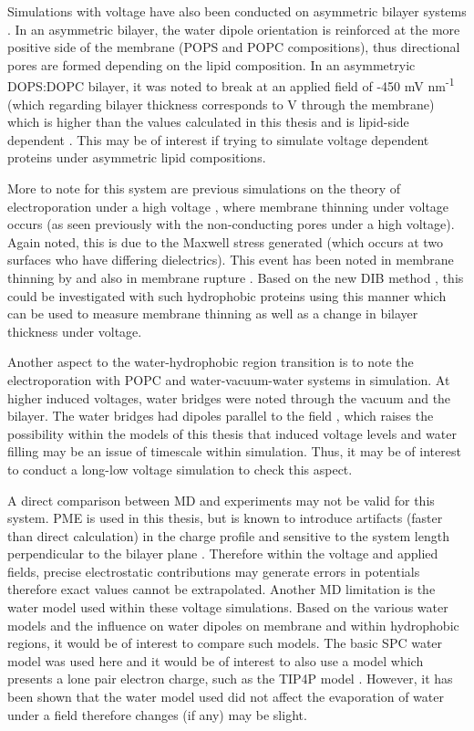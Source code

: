 Simulations with voltage have also been conducted on asymmetric bilayer systems \cite{Marrink1993,Saiz2002}. In an asymmetric bilayer, the water dipole orientation is reinforced at the more positive side of the membrane (POPS and POPC compositions), thus directional pores are formed depending on the lipid composition. In an asymmetryic DOPS:DOPC bilayer, it was noted to break at an applied field of -450 mV nm\textsuperscript{-1} (which regarding bilayer thickness corresponds to  V through the membrane) \cite{Vernier2006b} which is higher than the values calculated in this thesis and is lipid-side dependent \cite{Gurtovenko2014a}. This may be of interest if trying to simulate voltage dependent proteins under asymmetric lipid compositions.

More to note for this system are previous simulations on the theory of electroporation under a high voltage \cite{Hu2013c}, where membrane thinning under voltage occurs (as seen previously with the non-conducting pores under a high voltage). Again noted, this is due to the Maxwell stress generated (which occurs at two surfaces who have differing dielectrics). This event has been noted in membrane thinning by \cite{Needham1989,Kummrow1991} and also in membrane rupture \cite{Isambert1998,Gao2008}. Based on the new DIB method \cite{Gross2011a}, this could be investigated with such hydrophobic proteins using this manner which can be used to measure membrane thinning as well as a change in bilayer thickness under voltage.

Another aspect to the water-hydrophobic region transition is to note the electroporation with POPC and water-vacuum-water systems in simulation. At higher induced voltages, water bridges were noted through the vacuum and the bilayer. The water bridges had dipoles parallel to the field \cite{Ho2013}, which raises the possibility within the models of this thesis that induced voltage levels and water filling may be an issue of timescale within simulation. Thus, it may be of interest to conduct a long-low voltage simulation to check this aspect.  

A direct comparison between MD and experiments may not be valid for this system. PME is used in this thesis, but is known to introduce artifacts (faster than direct calculation) in the charge profile and sensitive to the system length perpendicular to the bilayer plane \cite{Spohr1997}. Therefore within the voltage and applied fields, precise electrostatic contributions may generate errors in potentials therefore exact values cannot be extrapolated. Another MD limitation is the water model used within these voltage simulations. Based on the various water models \cite{Chaplin2001} and the influence on water dipoles on membrane and within hydrophobic regions, it would be of interest to compare such models. The basic SPC water model was used here and it would be of interest to also use a model which presents a lone pair electron charge, such as the TIP4P model \cite{Jorgensen1983}. However, it has been shown that the water model used did not affect the evaporation of water under a field \cite{Okuno2009} therefore changes (if any) may be slight. 
